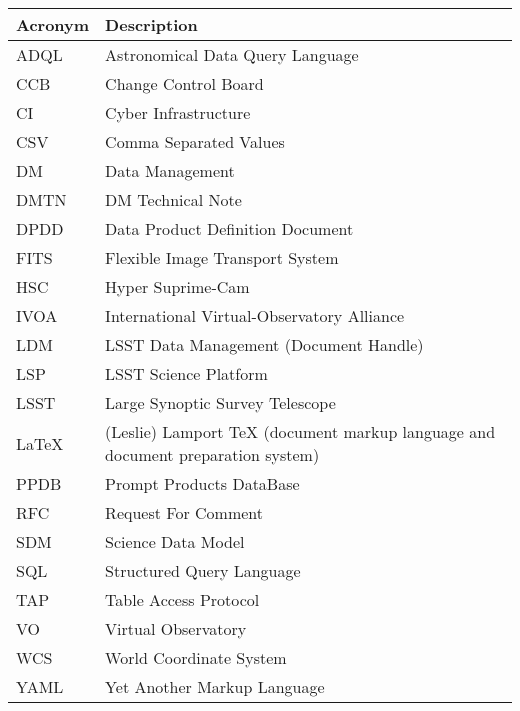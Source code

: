 \addtocounter{table}{-1}
\begin{longtable}{p{}p{}}\hline
\textbf{Acronym} & \textbf{Description}  \\\hline

ADQL & Astronomical Data Query Language \\\hline
CCB & Change Control Board \\\hline
CI & Cyber Infrastructure \\\hline
CSV & Comma Separated Values \\\hline
DM & Data Management \\\hline
DMTN & DM Technical Note \\\hline
DPDD & Data Product Definition Document \\\hline
FITS & Flexible Image Transport System \\\hline
HSC & Hyper Suprime-Cam \\\hline
IVOA & International Virtual-Observatory Alliance \\\hline
LDM & LSST Data Management (Document Handle) \\\hline
LSP & LSST Science Platform \\\hline
LSST & Large Synoptic Survey Telescope \\\hline
LaTeX & (Leslie) Lamport TeX (document markup language and document preparation system) \\\hline
PPDB & Prompt Products DataBase \\\hline
RFC & Request For Comment \\\hline
SDM & Science Data Model \\\hline
SQL & Structured Query Language \\\hline
TAP & Table Access Protocol \\\hline
VO & Virtual Observatory \\\hline
WCS & World Coordinate System \\\hline
YAML & Yet Another Markup Language \\\hline
\end{longtable}

